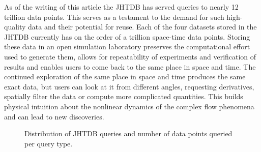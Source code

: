 \documentclass[10pt,twocolumn]{article}
\begin{document}
As of the writing of this article the JHTDB has served queries to nearly 12 trillion data points. This serves as a testament to the demand for such high-quality
data and their potential for reuse. Each of the four datasets stored in the JHTDB currently has on the order of a trillion space-time data points. Storing
these data in an open simulation laboratory preserves the computational effort used to generate them, allows for repeatability of experiments and 
verification of results and enables users to come back to the same place in space and time. The continued exploration of the same place in space and 
time produces the same exact data, but users can look at it from different angles, requesting derivatives, spatially filter the data or compute more 
complicated quantities. 
This builds physical intuition about the nonlinear dynamics of the complex flow phenomena and can lead to new discoveries. 

\begin{figure}
\centering
{}
\caption{Distribution of JHTDB queries and number of data points queried per query type.}
\label{fig:query_types}
\end{figure}
\end{document}
